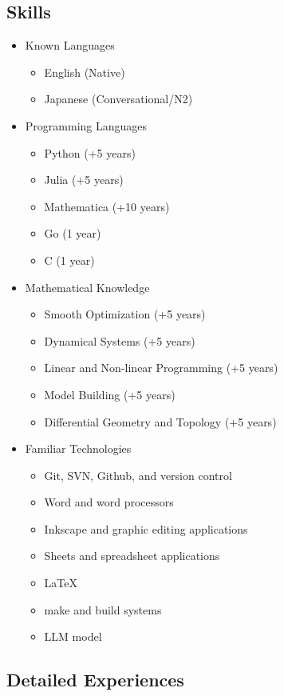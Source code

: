 \subsection{Skills}

\begin{itemize}
  \item Known Languages
    \begin{itemize}
      \item English (Native)
      \item Japanese (Conversational/N2)
    \end{itemize}
  \item Programming Languages
    \begin{itemize}
      \item Python (+5 years)
      \item Julia (+5 years)
      \item Mathematica (+10 years)
      \item Go (1 year)
      \item C (1 year)
    \end{itemize}
  \item Mathematical Knowledge
    \begin{itemize}
      \item Smooth Optimization (+5 years)
      \item Dynamical Systems (+5 years)
      \item Linear and Non-linear Programming (+5 years)
      \item Model Building (+5 years)
      \item Differential Geometry and Topology (+5 years)
    \end{itemize}
  \item Familiar Technologies
    \begin{itemize}
      \item Git, SVN, Github, and version control
      \item Word and word processors
      \item Inkscape and graphic editing applications
      \item Sheets and spreadsheet applications
      \item LaTeX
      \item make and build systems
      \item LLM model
    \end{itemize}
\end{itemize}

\subsection{Detailed Experiences}


